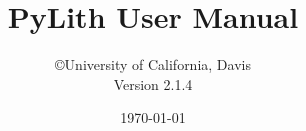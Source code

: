 \documentclass{pylithdoc}
\title{PyLith User Manual}
\author{\copyright University of California, Davis\\ Version 2.1.4}
\date{\today}
\begin{document}

\maketitle

\frontmatter
\tableofcontents{}
\listoffigures
\listoftables


\mainmatter\raggedbottom












\appendix






\end{document}
